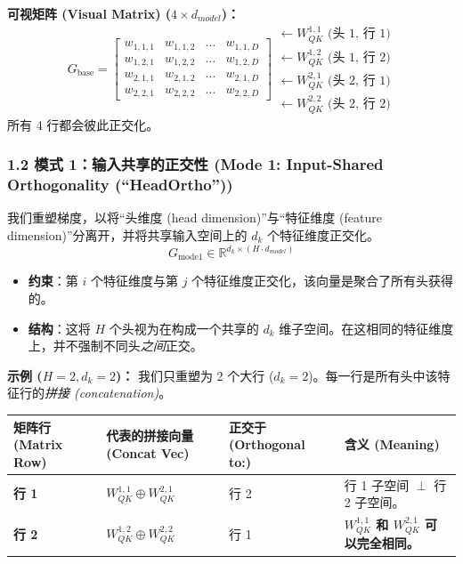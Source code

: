 \documentclass[12pt]{article}
\begin{document}
\textbf{可视矩阵 (Visual Matrix) ($4 \times d_{model}$)：}
$$
G_{\text{base}} = 
\begin{bmatrix}
w_{1,1,1} & w_{1,1,2} & \dots & w_{1,1,D} \\
w_{1,2,1} & w_{1,2,2} & \dots & w_{1,2,D} \\
w_{2,1,1} & w_{2,1,2} & \dots & w_{2,1,D} \\
w_{2,2,1} & w_{2,2,2} & \dots & w_{2,2,D}
\end{bmatrix}
\begin{matrix}
\leftarrow W_{QK}^{1,1} \text{ (头 1, 行 1)} \\
\leftarrow W_{QK}^{1,2} \text{ (头 1, 行 2)} \\
\leftarrow W_{QK}^{2,1} \text{ (头 2, 行 1)} \\
\leftarrow W_{QK}^{2,2} \text{ (头 2, 行 2)}
\end{matrix}
$$
所有 4 行都会彼此正交化。

\subsubsection*{1.2 模式 1：输入共享的正交性 (Mode 1: Input-Shared Orthogonality (``HeadOrtho''))}
我们重塑梯度，以将“头维度 (head dimension)”与“特征维度 (feature dimension)”分离开，并将共享输入空间上的 $d_k$ 个特征维度正交化。
$$G_{\text{mode1}} \in \mathbb{R}^{d_k \times (H \cdot d_{model})}$$
\begin{itemize}
    \item \textbf{约束}：第 $i$ 个特征维度与第 $j$ 个特征维度正交化，该向量是聚合了所有头获得的。
    \item \textbf{结构}：这将 $H$ 个头视为在构成一个共享的 $d_k$ 维子空间。在这相同的特征维度上，并不强制不同头\textit{之间}正交。
\end{itemize}

\textbf{示例 ($H=2, d_k=2$)：}
我们只重塑为 2 个大行 ($d_k=2$)。每一行是所有头中该特征行的\textit{拼接 (concatenation)}。

\begin{table}[h]
\centering
\color{lighttext}
\begin{tabularx}{\textwidth}{l X X X}
\toprule
矩阵行 (Matrix Row) & 代表的拼接向量 (Concat Vec) & 正交于 (Orthogonal to:) & 含义 (Meaning) \\
\midrule
\textbf{行 1} & $W_{QK}^{1,1} \oplus W_{QK}^{2,1}$ & 行 2 & 行 1 子空间 $\perp$ 行 2 子空间。 \\
\textbf{行 2} & $W_{QK}^{1,2} \oplus W_{QK}^{2,2}$ & 行 1 & \textbf{$W_{QK}^{1,1}$ 和 $W_{QK}^{2,1}$ 可以完全相同。} \\
\bottomrule
\end{tabularx}
\end{table}
\end{document}
